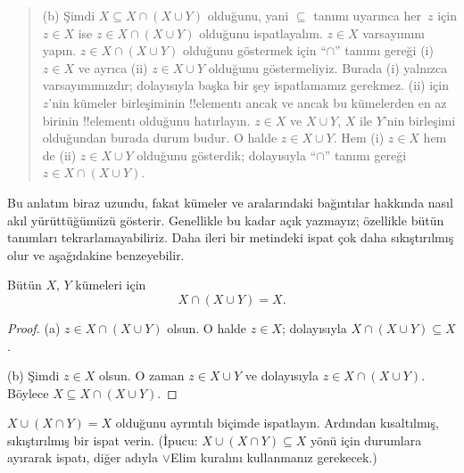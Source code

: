\documentclass[../../../include/open-logic-section]{subfiles}
\begin{document}
\begin{explain}
\begin{quote}
(b) Şimdi $X \subseteq X \cap (X \cup Y)$ olduğunu, yani $\subseteq$ tanımı
uyarınca her~$z$ için $z \in X$ ise $z \in X \cap (X \cup Y)$ olduğunu
ispatlayalım. $z \in X$ varsayımını yapın. $z \in X \cap (X \cup Y)$
olduğunu göstermek için ``$\cap$'' tanımı gereği (i) $z \in X$ ve ayrıca
(ii) $z \in X \cup Y$ olduğunu göstermeliyiz. Burada (i) yalnızca
varsayımımızdır; dolayısıyla başka bir şey ispatlamamız gerekmez. (ii) için
$z$'nin kümeler birleşiminin !!{element}{}ı ancak ve ancak bu kümelerden en az
birinin !!{element}{}ı olduğunu hatırlayın. $z \in X$ ve $X \cup Y$, $X$ ile
$Y$'nin birleşimi olduğundan burada durum budur. O halde $z \in X \cup Y$.
Hem (i) $z \in X$ hem de (ii) $z \in X \cup Y$ olduğunu gösterdik;
dolayısıyla ``$\cap$'' tanımı gereği $z \in X \cap (X \cup Y)$.
\end{quote}

Bu anlatım biraz uzundu, fakat kümeler ve aralarındaki bağıntılar hakkında
nasıl akıl yürüttüğümüzü gösterir. Genellikle bu kadar açık yazmayız;
özellikle bütün tanımları tekrarlamayabiliriz. Daha ileri bir metindeki ispat
çok daha sıkıştırılmış olur ve aşağıdakine benzeyebilir.
\end{explain}


\begin{prop}[Yutma]
Bütün $X$, $Y$ kümeleri için
\[
X \cap (X \cup Y) = X.
\]
\end{prop}

\begin{proof}
(a) $z \in X \cap (X \cup Y)$ olsun. O halde $z \in X$; dolayısıyla
$X \cap (X \cup Y) \subseteq X$.

(b) Şimdi $z \in X$ olsun. O zaman $z \in X \cup Y$ ve dolayısıyla
$z \in X \cap (X \cup Y)$. Böylece $X \subseteq X \cap (X \cup Y)$.
\end{proof}

\begin{prob}
$X \cup (X \cap Y) = X$ olduğunu ayrıntılı biçimde ispatlayın. Ardından
kısaltılmış, sıkıştırılmış bir ispat verin. (İpucu: $X \cup (X \cap Y)
\subseteq X$ yönü için durumlara ayırarak ispatı, diğer adıyla $\lor$Elim
kuralını kullanmanız gerekecek.)
\end{prob}
\end{document}
